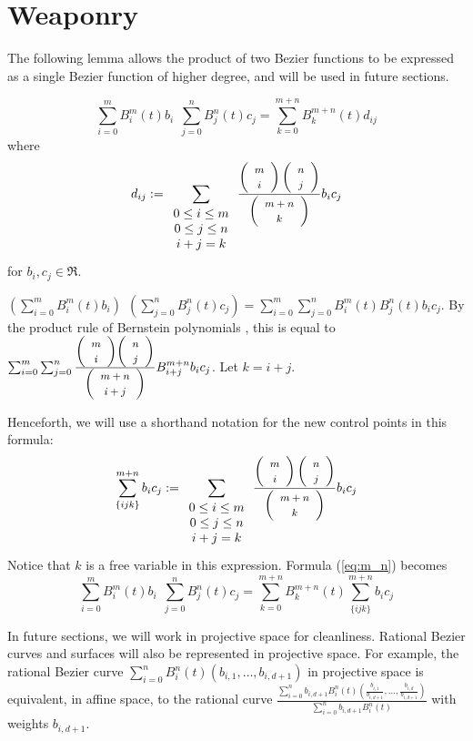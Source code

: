 \section{Weaponry}
\label{sec:weapon}

The following lemma allows the product of two Bezier functions to be
expressed as a single Bezier function of higher degree, and will be
used in future sections.

\begin{lemma}
\label{lem:product}
\begin{equation}
\label{eq:m_n}
\sum_{i=0}^{m} B_i^m(t) b_i \ \ \sum_{j=0}^{n} B_j^n(t) c_j
= \sum_{k=0}^{m+n} B_k^{m+n}(t) d_{ij}
\end{equation}
where
\[
d_{ij} := \sum_{\begin{array}{c} 0 \leq i \leq m \\ 
			     0 \leq j \leq n \\ 
			     i+j=k
			     \end{array}}
	\frac{\left( \begin{array}{c} \mbox{\footnotesize{$m$}} \\ \mbox{\footnotesize{$i$}} \end{array} \right) \left( \begin{array}{c} \mbox{\footnotesize{$n$}} \\ \mbox{\footnotesize{$j$}} \end{array} \right)}{\left( \begin{array}{c} \mbox{\footnotesize{$m+n$}} \\ \mbox{\footnotesize{$k$}} \end{array} \right)}  b_i c_j
\]
for $b_i,c_j \in \Re$.
\end{lemma}
\prf
$(\sum_{i=0}^{m} B_i^m(t) b_i) \ \ (\sum_{j=0}^{n} B_j^n(t) c_j)
= \sum_{i=0}^{m} \sum_{j=0}^{n} B_i^m(t) B_j^n(t) b_i c_j$.
By the product rule of Bernstein polynomials \cite{farin93},
this is equal to
$\sum_{i=0}^{m} \sum_{j=0}^{n} 
	\frac{\left( \begin{array}{c} \mbox{\footnotesize{$m$}} \\ \mbox{\footnotesize{$i$}} \end{array} \right) \left( \begin{array}{c} \mbox{\footnotesize{$n$}} \\ \mbox{\footnotesize{$j$}} \end{array} \right)}{\left( \begin{array}{c} \mbox{\footnotesize{$m+n$}} \\ \mbox{\footnotesize{$i+j$}} \end{array} \right)}
	B_{i+j}^{m+n} b_i c_j$.
Let $k=i+j$.
\QED

Henceforth, we will use a shorthand notation for the new control points
in this formula:
\begin{equation}
\sum_{\{ijk\}}^{m+n} b_i c_j := 
\sum_{\begin{array}{c} 0 \leq i \leq m \\ 
		     0 \leq j \leq n \\ 
		     i+j=k
		     \end{array}}
\frac{\left( \begin{array}{c} \mbox{\footnotesize{$m$}} \\ \mbox{\footnotesize{$i$}} \end{array} \right) \left( \begin{array}{c} \mbox{\footnotesize{$n$}} \\ \mbox{\footnotesize{$j$}} \end{array} \right)}{\left( \begin{array}{c} \mbox{\footnotesize{$m+n$}} \\ \mbox{\footnotesize{$k$}} \end{array} \right)} b_i c_j
\end{equation}
Notice that $k$ is a free variable in this expression.
Formula (\ref{eq:m_n}) becomes
\begin{equation}
\label{eq:shorthand}
\sum_{i=0}^{m} B_i^m(t) b_i \ \ \sum_{j=0}^{n} B_j^n(t) c_j
= \sum_{k=0}^{m+n} B_k^{m+n}(t) \sum_{\{ijk\}}^{m+n} b_i c_j
\end{equation}

In future sections,
we will work in projective space for cleanliness.
Rational Bezier curves and surfaces will also be represented in projective
space.
For example, the rational Bezier curve 
$\sum_{i=0}^{n} B_i^n(t) (b_{i,1},\ldots,b_{i,d+1})$ in projective space is
equivalent, in affine space, to the rational curve 
$\frac{\sum_{i=0}^{n} b_{i,d+1} B_i^n(t) 
	(\frac{b_{i,1}}{b_{i,d+1}},\ldots,\frac{b_{i,d}}{b_{i,d+1}})}
      {\sum_{i=0}^{n} b_{i,d+1} B_i^n(t)}$
with weights $b_{i,d+1}$.

